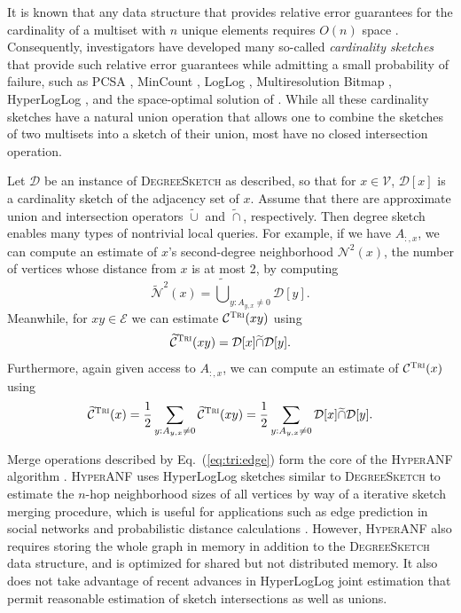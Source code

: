 \documentclass{report}
\newcommand{\algoname}[1]{\textnormal{\textsc{#1}}}
\begin{document}
It is known that any data structure that provides relative error guarantees for the cardinality of a multiset with $n$ unique elements requires $O(n)$ space \cite{alon1999space}.
Consequently, investigators have developed many so-called \emph{cardinality sketches} that provide such relative error guarantees while admitting a small probability of failure, such as PCSA \cite{flajolet1985probabilistic}, MinCount \cite{bar2002counting},  LogLog \cite{durand2003loglog}, Multiresolution Bitmap \cite{estan2003bitmap}, HyperLogLog \cite{flajolet2007hyperloglog}, and the space-optimal solution of \cite{kane2010optimal}.
While all these cardinality sketches have a natural union operation that allows one to combine the sketches of two multisets into a sketch of their union, most have no closed intersection operation.

Let $\mathcal{D}$ be an instance of \algoname{DegreeSketch} as described, so that for $x \in \mathcal{V}$, $\mathcal{D}[x]$ is a cardinality sketch of the adjacency set of $x$.
Assume that there are approximate union and intersection operators $\widetilde{\cup}$ and $\widetilde{\cap}$, respectively.
Then degree sketch enables many types of nontrivial local queries. 
For example, if we have $A_{:,x}$, we can compute an estimate of $x$'s second-degree neighborhood $\mathcal{N}^2(x)$, the number of vertices whose distance from $x$ is at most 2, by computing 
%
\begin{equation} \label{eq:tri:edge}
	\widetilde{\mathcal{N}}^2(x) 
	= \widetilde{\bigcup}_{y: A_{y,x} \neq 0} \mathcal{D}[y].
\end{equation}
%
Meanwhile, for $xy \in \mathcal{E}$ we can estimate $\mathcal{C}^{\algoname{Tri}}(xy)$ using 
%
\begin{equation} \label{eq:tri:edge}
	\widetilde{\mathcal{C}}^{\algoname{Tri}}(xy) 
	= \mathcal{D}[x] \widetilde{\cap} \mathcal{D}[y].
\end{equation}
%
Furthermore, again given access to $A_{:,x}$, we can compute an estimate of $\mathcal{C}^{\algoname{Tri}}(x)$ using
%
\begin{equation} \label{eq:tri:edge}
	\widetilde{\mathcal{C}}^{\algoname{Tri}}(x) 
	= \frac{1}{2} \sum_{y: A_{y,x} \neq 0} \widetilde{\mathcal{C}}^{\algoname{Tri}}(xy)  
	= \frac{1}{2} \sum_{y: A_{y,x} \neq 0} \mathcal{D}[x] \widetilde{\cap} \mathcal{D}[y].
\end{equation}
%

Merge operations described by Eq.~(\ref{eq:tri:edge}) form the core of the \algoname{HyperANF} algorithm \cite{boldi2011hyperanf}.
\algoname{HyperANF} uses HyperLogLog sketches similar to \algoname{DegreeSketch} to estimate the $n$-hop neighborhood sizes of all vertices by way of a iterative sketch merging procedure, which is useful for applications such as edge prediction in social networks \cite{gupta2013wtf} and probabilistic distance calculations \cite{boldi2011hyperanf, myers2014information}.
However, \algoname{HyperANF} also requires storing the whole graph in memory in addition to the \algoname{DegreeSketch} data structure, and is optimized for shared but not distributed memory. 
It also does not take advantage of recent advances in HyperLogLog joint estimation that permit reasonable estimation of sketch intersections as well as unions.
\end{document}

